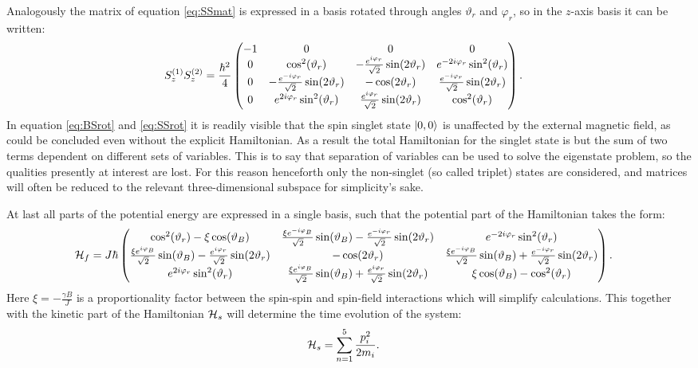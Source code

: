 \documentclass[a4paper]{article}
\begin{document}
Analogously the matrix of equation \ref{eq:SSmat} is expressed in a basis rotated through
angles \(\vartheta_r\) and \(\varphi_r\), so in the \(z\)-axis basis it can be written:
\begin{align}\label{eq:SSrot}
        S^{(1)}_zS^{(2)}_z &= \frac{\hbar{}^2}{4}\pmqty{-1 & 0 & 0 & 0\\
                0 & \cos[2](\vartheta_r) & -\frac{e^{i\varphi_r}}{\sqrt{2}
                }\sin(2\vartheta_r) & e^{-2i\varphi_r}\sin[2](\vartheta_r)\\
                0 & -\frac{e^{-i\varphi_r}}{\sqrt{2}
                }\sin(2\vartheta_r) & -\cos(2\vartheta_r) & \frac{e^{-i\varphi_r}}{\sqrt{2}
        }\sin(2\vartheta_r)\\
        0 & e^{2i\varphi_r}\sin[2](\vartheta_r) & \frac{e^{i\varphi_r}}{\sqrt{2}
        }\sin(2\vartheta_r) & \cos[2](\vartheta_r)}
.\end{align}
In equation \ref{eq:BSrot} and \ref{eq:SSrot} it is readily visible that the spin singlet state \(\ket{0, 0}\) is unaffected by
the external magnetic field, as could be concluded even without the explicit Hamiltonian.
As a result the total Hamiltonian for the singlet state is but the sum of two terms
dependent on different sets of variables. This is to say that separation of variables can
be used to solve the eigenstate problem, so the qualities presently at interest are lost.
For this reason henceforth only the non-singlet (so called triplet) states are considered,
and matrices will often be reduced to the relevant three-dimensional subspace for
simplicity's sake.

At last all parts of the potential energy are expressed in a single basis, such that the
potential part of the Hamiltonian takes the form:
\begin{align}\label{eq:Hf}
        \mathbb{\cal H}_f &= J\hbar{} \pmqty{
                 \cos[2](\vartheta_r) - \xi \cos(\vartheta_B)& \frac{\xi
                        e^{-i\varphi_B}}{\sqrt{2}
                }\sin(\vartheta_B) - \frac{e^{-i\varphi_r}}{\sqrt{2} }\sin(2\vartheta_r) &
                e^{-2i\varphi_r}\sin[2](\vartheta_r)\\
                 \frac{\xi e^{i\varphi_B}}{\sqrt{2} }\sin(\vartheta_B) -
                \frac{e^{i\varphi_r}}{\sqrt{2} }\sin(2\vartheta_r) & -\cos(2\vartheta_r) & \frac{\xi
                e^{-i\varphi_B}}{\sqrt{2} }\sin(\vartheta_B)+ \frac{e^{-i\varphi_r}}{\sqrt{2}
        }\sin(2\vartheta_r)\\
                e^{2i\varphi_r}\sin[2](\vartheta_r) & \frac{\xi
                e^{i\varphi_B}}{\sqrt{2} }\sin(\vartheta_B) +
                        \frac{e^{i\varphi_r}}{\sqrt{2} }\sin(2\vartheta_r) &
                        \xi\cos(\vartheta_B) - \cos[2](\vartheta_r)
        }
.\end{align}
Here \(\xi = -\frac{\gamma B}{J}\) is a proportionality factor between the spin-spin
and spin-field interactions which will simplify calculations. This together with the
kinetic part of the Hamiltonian \(\mathbb{\cal H}_s\) will determine the time evolution of
the system:
\begin{align}\label{eq:Hs}
        \mathbb{\cal H}_s &= \sum_{n=1}^{5} \frac{p_i^2}{2m_i}
.\end{align}
\end{document}
